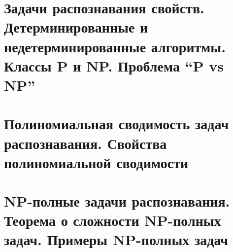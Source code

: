 \documentclass[a4paper]{article}
\theoremstyle{definition}
\theoremstyle{remark}
\begin{document}
\begin{multicols*}{2}
    \section{Задачи распознавания свойств. Детерминированные и недетерминированные 
    алгоритмы. Классы P и NP. Проблема “P vs NP”}
    \section{Полиномиальная сводимость задач распознавания. Свойства полиномиальной 
    сводимости}
    \section{NP-полные задачи распознавания. Теорема о сложности NP-полных задач. Примеры 
    NP-полных задач}
\end{multicols*}
\end{document}
